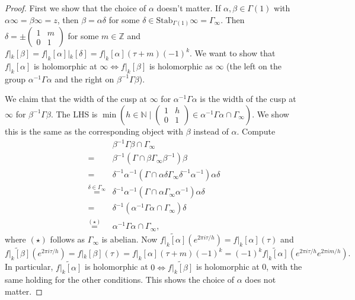\documentclass{article}
\theoremstyle{definition}
\begin{document}
\begin{proof}
    First we show that the choice of $\alpha$ doesn't matter. If $\alpha,\beta \in \Gamma(1)$ with $\alpha \infty = \beta \infty = z$, then $\beta = \alpha \delta$ for some $\delta \in \text{Stab}_{\Gamma(1)}\infty = \Gamma_{\infty}$. Then $\delta = \pm  \begin{pmatrix} 1 & m \\0 & 1 \end{pmatrix}$ for some $m \in \mathbb{Z}$ and $f|_k[\beta]=f|_k[\alpha]|_k[\delta]=f|_k[\alpha](\tau+m)(-1)^k$. We want to show that $f|_k[\alpha]$ is holomorphic at $\infty \iff f|_k[\beta]$ is holomorphic as $\infty$ (the left on the group $\alpha^{-1} \Gamma \alpha$ and the right on $\beta ^{-1} \Gamma \beta$).
    \vspace{1mm}
     
    We claim that the width of the cusp at $\infty$ for $\alpha ^{-1} \Gamma \alpha$ is the width of the cusp at $\infty$ for $\beta ^{-1} \Gamma \beta$. The LHS is $\min \left(h \in \mathbb{N} \mid \begin{pmatrix} 1&h\\0&1 \end{pmatrix} \in \alpha ^{-1} \Gamma \alpha \cap \Gamma_{\infty}\right)$. We show this is the same as the corresponding object with $\beta$ instead of $\alpha$. Compute 
    \begin{align*}
        &\beta ^{-1} \Gamma \beta \cap \Gamma_\infty \\
        =& \beta^{-1} ( \Gamma \cap \beta \Gamma_{\infty} \beta ^{-1})\beta \\
        =& \delta^{-1} \alpha^{-1} (\Gamma \cap \alpha \delta \Gamma_{\infty}\delta ^{-1} \alpha ^{-1})\alpha \delta \\
        \stackrel{\delta \in \Gamma_{\infty}}{=} & \delta ^{-1} \alpha^{-1}(\Gamma \cap \alpha \Gamma_\infty \alpha^{-1})\alpha \delta \\=& \delta^{-1} (\alpha^{-1} \Gamma \alpha \cap \Gamma_{\infty})\delta \\\stackrel{(\star)}{=}& \alpha^{-1}\Gamma \alpha \cap \Gamma_\infty,
    \end{align*} 
    where $(\star)$ follows as $\Gamma_{\infty}$ is abelian.
    Now $\widetilde{f|_k[\alpha]}(e^{2 \pi i \tau/h}) = f|_k[\alpha](\tau)$ and $$\widetilde{f|_k[\beta]}(e^{2 \pi i \tau/h}) = f|_k[\beta](\tau) = f|_k[\alpha](\tau+m)(-1)^k = (-1)^k \widetilde{f|_k[\alpha]}(e^{2\pi i \tau/h} e^{2 \pi i m/h}).$$
    In particular, $\widetilde{f|_k[\alpha]}$ is holomorphic at $0 \iff \widetilde{f|_k[\beta]}$ is holomorphic at 0, with the same holding for the other conditions. This shows the choice of $\alpha$ does not matter.
    \vspace{1mm}
     

\end{proof}
\end{document}
